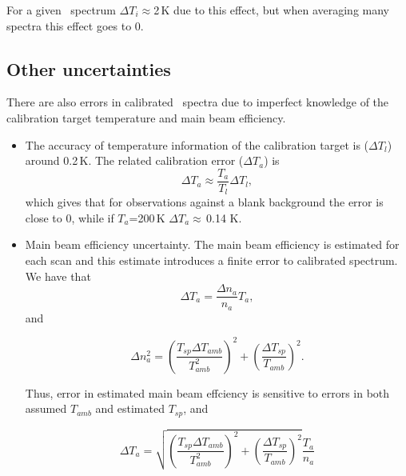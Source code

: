 For a given \smr\ spectrum \(\Delta T_{i}\)\(\approx\)2\,K due to this effect,
but when averaging many spectra this effect goes to 0.





\subsection{Other uncertainties}
\label{sec:otheruncer}

There are also errors in calibrated \smr\ spectra due to imperfect knowledge of
the calibration target temperature and main beam efficiency. 

\begin{itemize}

\item The accuracy of temperature information of the calibration target
 is (\(\Delta T_{l}\)) around 0.2\,K. The related calibration error (\(\Delta T_{a}\)) is
 \begin{equation}
  \Delta T_{a} \approx \frac{T_{a}}{T_{l}} \Delta T_{l},
 \end{equation}
 which gives that for observations against a blank background the error
 is close to 0, while if \(T_{a}\)=200\,K \(\Delta T_{a}\)\(\approx\)\,0.14 K.

\item Main beam efficiency uncertainty. The main beam efficiency is estimated
 for each scan and this estimate introduces a finite error to calibrated spectrum.
 We have that
 \begin{equation}
  \Delta T_{a} = \frac{\Delta n_{a}}{n_{a}}T_{a},
 \end{equation}
 and

 \begin{equation}
  \Delta n_{a}^{2} = \left(\frac{T_{sp}\Delta T_{amb}}{T_{amb}^{2}}\right)^{2} + 
                     \left( \frac{\Delta T_{sp}}{T_{amb}} \right)^2.
 \end{equation}

Thus, error in estimated main beam effciency is sensitive to errors in both assumed 
\(T_{amb}\) and estimated \(T_{sp}\), and 

\begin{equation}
  \Delta T_{a} = \sqrt{ \left(\frac{T_{sp}\Delta T_{amb}}{T_{amb}^{2}}\right)^{2} +
                     \left( \frac{\Delta T_{sp}}{T_{amb}} \right)^2 } \frac{T_{a}}{n_a}
\label{eq:tanaerr}
\end{equation}



\end{itemize}
